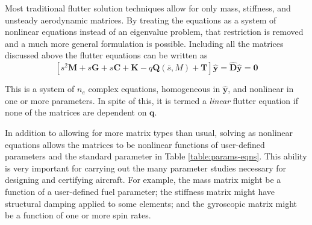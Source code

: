 \documentclass[10pt,openany,twoside]{book}
\numberwithin{equation}{section}   %
\newcommand{\Matrix}[1]{\boldsymbol{#1}}
\newcommand{\Vector}[1]{\boldsymbol{#1}}
\newcommand{\Tableref}[1]{Table \ref{#1}}
\begin{document}
Most traditional flutter solution techniques allow for only mass, stiffness,
and unsteady aerodynamic matrices. By treating the equations as a system
of nonlinear equations instead of an eigenvalue problem, that restriction
is removed and a much more general formulation is possible.
Including all the matrices discussed above the flutter equations can
be written as
\begin{equation}\label{eqn:flut}
	\left[ s^2 \Matrix{M} + s \Matrix{G} + s \Matrix{C} +
		 \Matrix{K} - q \Matrix{Q} (\bar{s},M)
		 + \Matrix{T} \right] \hat{\Vector{y}} =
		 	\hat{\Matrix{D}}\hat{\Vector{y}} = \Vector{0}
\end{equation}

This is a system of $n_e$ complex equations, homogeneous
in $\Vector{\hat{y}}$, and nonlinear in one or more parameters. In spite of
this, it is termed a \emph{linear} flutter equation if none of the matrices are
dependent on $\Vector{q}$.

In addition to allowing for more matrix types than usual, solving as nonlinear
equations allows the matrices to be nonlinear functions of user-defined parameters
and the standard parameter in \Tableref{table:params-eqns}.
This ability is very important for carrying out the many parameter studies
necessary for designing and certifying aircraft.
For example, the mass matrix might be a function of a user-defined fuel parameter;
the stiffness matrix might have structural damping applied to some elements;
and the gyroscopic matrix might be a function of one or more spin rates.
\end{document}
